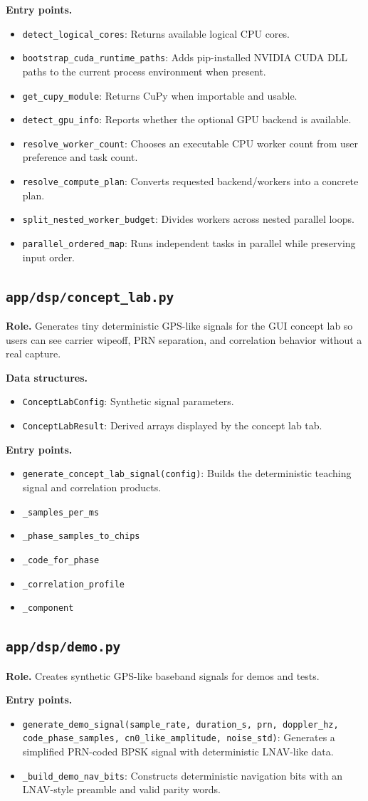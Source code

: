 \documentclass[11pt,a4paper]{article}
\newcommand{\codepath}[1]{\nolinkurl{#1}}
\newcommand{\codeheading}[1]{\texorpdfstring{\codepath{#1}}{#1}}
\newcommand{\codesym}[1]{\nolinkurl{#1}}
\newcommand{\apiitem}[2]{\item \codesym{#1}: #2}
\newcommand{\apisym}[1]{\item \codesym{#1}}
\begin{document}
\textbf{Entry points.}
\begin{itemize}
  \apiitem{detect_logical_cores}{Returns available logical CPU cores.}
  \apiitem{bootstrap_cuda_runtime_paths}{Adds pip-installed NVIDIA CUDA DLL paths to the current process environment when present.}
  \apiitem{get_cupy_module}{Returns CuPy when importable and usable.}
  \apiitem{detect_gpu_info}{Reports whether the optional GPU backend is available.}
  \apiitem{resolve_worker_count}{Chooses an executable CPU worker count from user preference and task count.}
  \apiitem{resolve_compute_plan}{Converts requested backend/workers into a concrete plan.}
  \apiitem{split_nested_worker_budget}{Divides workers across nested parallel loops.}
  \apiitem{parallel_ordered_map}{Runs independent tasks in parallel while preserving input order.}
\end{itemize}

\subsection{\codeheading{app/dsp/concept_lab.py}}

\textbf{Role.} Generates tiny deterministic GPS-like signals for the GUI concept lab so users can see carrier wipeoff, PRN separation, and correlation behavior without a real capture.

\textbf{Data structures.}
\begin{itemize}
  \apiitem{ConceptLabConfig}{Synthetic signal parameters.}
  \apiitem{ConceptLabResult}{Derived arrays displayed by the concept lab tab.}
\end{itemize}

\textbf{Entry points.}
\begin{itemize}
  \apiitem{generate_concept_lab_signal(config)}{Builds the deterministic teaching signal and correlation products.}
  \apisym{\_samples_per_ms}
  \apisym{\_phase_samples_to_chips}
  \apisym{\_code_for_phase}
  \apisym{\_correlation_profile}
  \apisym{\_component}
\end{itemize}

\subsection{\codeheading{app/dsp/demo.py}}

\textbf{Role.} Creates synthetic GPS-like baseband signals for demos and tests.

\textbf{Entry points.}
\begin{itemize}
  \apiitem{generate_demo_signal(sample_rate, duration_s, prn, doppler_hz, code_phase_samples, cn0_like_amplitude, noise_std)}{Generates a simplified PRN-coded BPSK signal with deterministic LNAV-like data.}
  \apiitem{\_build_demo_nav_bits}{Constructs deterministic navigation bits with an LNAV-style preamble and valid parity words.}
\end{itemize}
\end{document}
